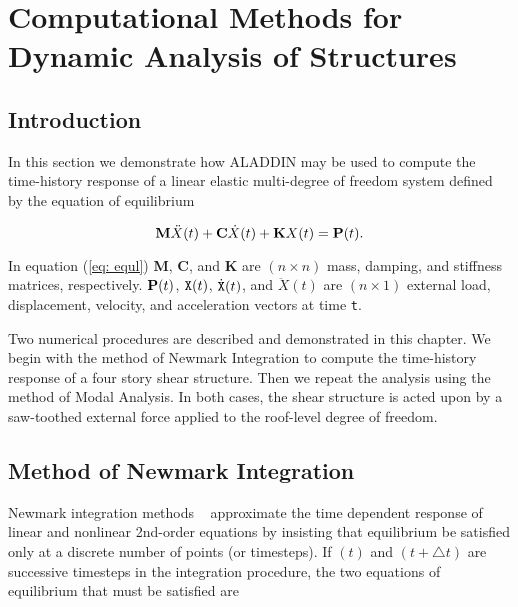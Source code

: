 
\chapter{Computational Methods for Dynamic Analysis of Structures}

\section{Introduction}

\vspace{0.15 in}
\noindent\hspace{0.50 in}
In this section we demonstrate how ALADDIN may be used to compute the
time-history response of a linear elastic multi-degree of freedom system 
defined by the equation of equilibrium

\begin{equation}
{\bf M} \ddot X(t) + {\bf C} {\dot X}(t) + {\bf K} X(t) = {\bf P}(t).
\label{eq: equl}
\end{equation}

\vspace{0.15 in}\noindent
In equation (\ref{eq: equl}) {\bf M}, {\bf C},
and {\bf K} are $(n \times n)$ mass,
damping, and stiffness matrices, respectively.
${\bf P}(t)$, ${\tt X}(t)$, $\dot{\tt X}{(t)}$, and $\ddot{X}{(t)}$
are $(n \times 1)$ external load, displacement, velocity,
and acceleration vectors at time {\tt t}.

\vspace{0.15 in}
\noindent\hspace{0.50 in}
Two numerical procedures are described and demonstrated in this chapter.
We begin with the method of Newmark Integration to compute the time-history
response of a four story shear structure. 
Then we repeat the analysis using the method of Modal Analysis.
In both cases, the shear structure is acted upon by a saw-toothed 
external force applied to the roof-level degree of freedom.

\section{Method of Newmark Integration}

\vspace{0.15 in}
\noindent\hspace{0.5 in}
Newmark integration methods ~\cite{bathe82} approximate the time
dependent response of linear and nonlinear 2nd-order equations by insisting
that equilibrium be satisfied only at a discrete number of points (or timesteps).
If $(t)$ and $(t+\triangle t)$ are successive timesteps in the integration procedure,
the two equations of equilibrium that must be satisfied are 

